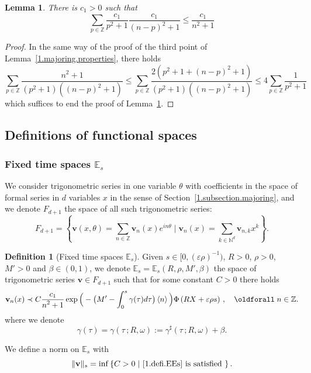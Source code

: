 \documentclass[10pt]{amsart}
\newtheorem{lemm}[cdrthm]{Lemma}
\theoremstyle{definition}
\newtheorem{defi}[cdrthm]{Definition}
\theoremstyle{plain}
\newcommand*\e{\varepsilon}
\newcommand*\N{{\mathbb N}}
\newcommand*\Z{{\mathbb Z}}
\newcommand*\EE{{\mathbb E}}
\newcommand*\g{\gamma}
\newcommand{\vbf}{{\mathbf v}}
\newcommand*\dsp{\displaystyle}
\renewcommand*{\forall}{\mathrel{\oldforall}}
\begin{document}
\begin{lemm}\label{1.lemma.c_1}
There is $c_1>0$ such that
\begin{equation}\label{1.definition.c_1}
\sum_{p\in\mathbb{Z}} \frac{\displaystyle c_1}{\displaystyle p^2+1} \frac{\displaystyle c_1}{\displaystyle (n-p)^2+1} \leq \frac{\displaystyle c_1}{\displaystyle n^2+1}
\end{equation}
\end{lemm}

\begin{proof}
In the same way of the proof of the third point of Lemma~\ref{1.majoring.properties}, there holds
\[
\sum_{p\in\mathbb{Z}} \frac{\displaystyle n^2+1}{\displaystyle (p^2+1)((n-p)^2+1)} \leq \sum_{p\in\mathbb{Z}} \frac{\displaystyle 2(p^2+1 + (n-p)^2 +1)}{\displaystyle (p^2+1)((n-p)^2+1)} \leq 4 \sum_{p\in\Z} \frac{\dsp 1}{\dsp p^2+1}
\]
which suffices to end the proof of Lemma~\ref{1.lemma.c_1}.
\end{proof}



\subsection{Definitions of functional spaces}



\subsubsection{Fixed time spaces \texorpdfstring{$\EE_{s}$}{EEs}}


We consider trigonometric series in one variable $\theta$ with coefficients in the space of formal series in $d$ variables $x$ in the sense of Section~\ref{1.subsection.majoring}, and we denote $F_{d+1}$ the space of all such trigonometric series:
\[
F_{d+1} = \left\{ \vbf(x,\theta) = \sum_{n\in\mathbb{Z}} \vbf_n(x) e^{in\theta} \;\Big|\; \vbf_n(x) = \sum_{k\in\N^{d}} \vbf_{n,k} x^{k} \right\}.
\]

\begin{defi}[Fixed time spaces $\EE_{s}$]\label{1.definition.EE_s}
Given $s\in[0,(\e \rho)^{-1})$, $R>0$, $\rho >0$, $M'>0$ and $\beta \in (0,1)$, we denote $\EE_{s} = \EE_{s}(R,\rho,M',\beta)$ the space of trigonometric series $\vbf\in F_{d+1}$ such that for some constant $C>0$ there holds
\begin{equation}\label{1.defi.EEs}
\vbf_n(x) \prec C\frac{\displaystyle c_1}{\displaystyle n^2+1}\exp\Big({}-\big(M' - \int_{0}^{s} \g(\tau)d\tau \big)\left< n \right>\Big) \Phi\left(R X+\e\rho s\right)\,,\quad \forall n \in\Z.
\end{equation}
where we denote
\begin{equation}\label{1.def.g}
\g(\tau) = \g(\tau \,;R,\omega) := \g^{\sharp}(\tau \, ; R,\omega) + \beta.
\end{equation}

We define a norm on $\EE_{s}$ with
\begin{equation}\label{1.defi.norm.s}
\|\vbf\|_{s} = \inf \left\{ C>0 \;|\text{~\eqref{1.defi.EEs}} \text{ is satisfied } \right\}.
\end{equation}
\end{defi}
\end{document}
